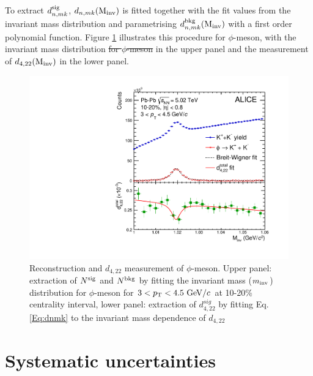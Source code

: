 \documentclass[ALICE,manyauthors]{cernphprep}
\providecommand{\DIFaddtex}[1]{{\protect\color{blue}\uwave{#1}}} %
\providecommand{\DIFdeltex}[1]{{\protect\color{red}\sout{#1}}}                      %
\providecommand{\DIFaddbegin}{} %
\providecommand{\DIFaddend}{} %
\providecommand{\DIFdelbegin}{} %
\providecommand{\DIFdelend}{} %
\providecommand{\DIFadd}[1]{\texorpdfstring{\DIFaddtex{#1}}{#1}} %
\providecommand{\DIFdel}[1]{\texorpdfstring{\DIFdeltex{#1}}{}} %
\begin{document}
\DIFaddend To extract $d_{n,mk}^{\rm{sig}}$, $d_{n,mk}({\rm M_{inv}})$ is fitted together with the fit values from the invariant mass distribution and parametrising $d_{n,mk}^{\rm{bkg}}({\rm M_{inv}})$ with a first order polynomial function. Figure \ref{d422_phi_meson} illustrates this procedure for \DIFaddbegin \DIFadd{the }\DIFaddend $\phi$-meson, with the invariant mass distribution \DIFdelbegin \DIFdel{for $\phi$-meson }\DIFdelend in the upper panel and the measurement of $d_{4,22}({\rm M_{inv}})$ in the lower panel. 

\begin{figure}[!htb]
\begin{center}
\includegraphics[scale=0.45]{figures/analysisMethod/flowmass_Phi.pdf}
\end{center}
\caption{Reconstruction and $d_{4,22}$ measurement of $\phi$-meson. Upper panel: extraction of $N^{\rm{sig}}$ and $N^{\rm{bkg}}$ by fitting the invariant mass ($m_{\rm{inv}}$) distribution for $\phi$-meson for $3<p_{\rm{T}}<4.5~{\rm GeV}/c$ at 10-20\% centrality interval, lower panel: extraction of $d_{4,22}^{sig}$ by fitting Eq. \ref{Eq:dnmk} to the invariant mass dependence of $d_{4,22}$}
\label{d422_phi_meson}
\end{figure}


\section{Systematic uncertainties}
\label{Sec:Systematics}
\end{document}
